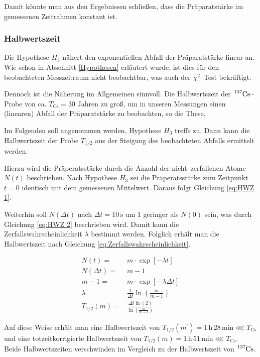 \documentclass[12pt,a4paper]{scrartcl}
\numberwithin{equation}{section} %
\begin{document}
Damit könnte man aus den Ergebnissen schließen, dass die Präparatstärke im gemessenen Zeitrahmen konstant ist.

\hypertarget{totzeit}{\subsubsection{Halbwertszeit}\label{totzeit}}
Die Hypothese $H_3$ nähert den exponentiellen Abfall der Präparatstärke linear an. Wie schon in Abschnitt \ref{Hypothesen} erläutert wurde, ist dies für den beobachteten Messzeitraum nicht beobachtbar, was auch der $\chi^2$--Test bekräftigt.

Dennoch ist die Näherung im Allgemeinen sinnvoll. Die Halbwertszeit der $\ce{^{137}Cs}$--Probe von ca. $T_\mathrm{Cs}=30$ Jahren \cite{Chart of Nuclides}  zu groß, um in unseren Messungen einen (linearen) Abfall der Präparatstärke zu beobachten, so die These.

Im Folgenden soll angenommen werden, Hypothese $H_3$ treffe zu. Dann kann die Halbwertszeit der Probe $T_{1/2}$ aus der Steigung des beobachteten Abfalls ermittelt werden.

Hierzu wird die Präperatsstärke durch die Anzahl der nicht--zerfallenen Atome $N(t)$ beschrieben. Nach Hypothese $H_3$ sei die Präperatsstärke zum Zeitpunkt $t=0$ identisch mit dem gemessenen Mittelwert. Daraus folgt Gleichung \eqref{eq:HWZ 1}.

Weiterhin soll $N(\Delta t)$ nach $\Delta t=10\mathrm{\,s}$ um $1$ geringer als $N(0)$ sein, was durch Gleichung \eqref{eq:HWZ 2} beschrieben wird. Damit kann die Zerfallswahrscheinlichkeit $\lambda$ bestimmt werden. Folglich erhält man die Halbwertszeit nach Gleichung \eqref{eq:Zerfallswahrscheinlichkeit}.

\begin{align}
	N(t) =& m \cdot \exp[-\lambda t] \label{eq:HWZ 1}\\
	N(\Delta t) =& m-1 \\
	m-1 =& m \cdot \exp[-\lambda \Delta t] \label{eq:HWZ 2}\\
	\lambda =& \frac{1}{\Delta t} \ln(\frac{m}{m-1}) \\
	T_{1/2}(m) =& \frac{\Delta t \ln(2)}{\ln(\frac{m}{m-1})}
\end{align}

\noindent
Auf diese Weise erhält man eine Halbwertszeit von $T_{1/2}(m^\prime)=1\,\mathrm{h}\,28\,\mathrm{min}\lll T_\mathrm{Cs}$ und eine totzeitkorrigierte Halbwertszeit von $T_{1/2}(m)=1\,\mathrm{h}\,51\,\mathrm{min}\lll T_\mathrm{Cs}$. Beide Halbwertszeiten verschwinden im Vergleich zu der Halbwertszeit von $\ce{^{137}Cs}$.
\end{document}
